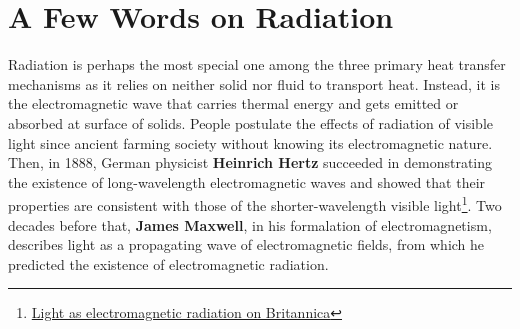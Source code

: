 \section{A Few Words on Radiation}
\quad Radiation is perhaps the most special one among the three primary heat transfer mechanisms as it relies on neither solid nor fluid to transport heat. Instead, it is the electromagnetic wave that carries thermal energy and gets emitted or absorbed at surface of solids. People postulate the effects of radiation of visible light since ancient farming society without knowing its electromagnetic nature. Then, in 1888, German physicist \textbf{Heinrich Hertz} succeeded in demonstrating the existence of long-wavelength electromagnetic waves and showed that their properties are consistent with those of the shorter-wavelength visible light\footnote{\href{https://www.britannica.com/science/light/Light-as-electromagnetic-radiation}{Light as electromagnetic radiation on Britannica}}. Two decades before that, \textbf{James Maxwell}, in his formalation of electromagnetism, describes light as a propagating wave of electromagnetic fields, from which he predicted the existence of electromagnetic radiation.

